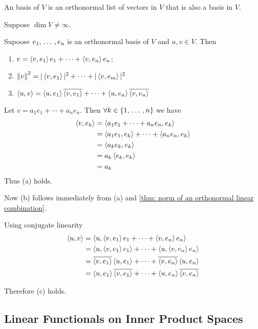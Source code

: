 \begin{mydef}
  An  basis of $V$ is an orthonormal list of vectors in $V$ that is also a basis in $V$.
\end{mydef}

\begin{mydef}
  Suppose $\dim V \neq \infty$.
\end{mydef}

\begin{thm}
  Supoose $e_1, \ddd, e_n$ is an orthonormal basis of $V$ and $u,v \in V$. Then
  \begin{enumerate}[label=(\alph*)]
    \item $v=\ip{v}{e_1}e_1 + \cdots + \ip{v}{e_n}e_n$;
    \item $\norm{v}^2 = |\ip{v}{e_1}|^2 + \cdots + |\ip{v}{e_m}|^2$
    \item $\ip{u}{v} = \ip{u}{e_1} \overline{\ip{v}{e_1}} + \cdots + \ip{u}{e_n} \overline{\ip{v}{e_n}}$
  \end{enumerate}
\end{thm}
\begin{prf}
  Let $v=a_1 e_1 + \cdots + a_n e_n$. Then $\forall k \in \{1, \ddd, n\}$ we have
  \begin{equation}
    \begin{aligned}
      \ip{v}{e_k}
      &=\ip{a_1 e_1 + \cdots + a_n e_n}{e_k} \\
      &=\ip{a_1 e_1}{e_k} + \cdots + \ip{a_n e_n}{e_k}\\
      &=\ip{a_ke_k}{e_k} \\
      &= a_k\ip{e_k}{e_k} \\
      &=a_k
    \end{aligned}
  \end{equation}
  Thus (a) holds.

  Now (b) follows immediately from (a) and \ref{thm: norm of an orthonormal linear combination}.

  Using conjugate linearity
  \begin{equation}
    \begin{aligned}
      \ip{u}{v}
      &=\ip{u}{\ip{v}{e_1}e_1 + \cdots + \ip{v}{e_n}e_n} \\
      &= \ip{u}{\ip{v}{e_1}e_1} + \cdots + \ip{u}{\ip{v}{e_n}e_n} \\
      &= \overline{\ip{v}{e_1}}\ip{u}{e_1} + \cdots + \overline{\ip{v}{e_n}}\ip{u}{e_n} \\
      &= \ip{u}{e_1}\overline{\ip{v}{e_1}} + \cdots + \ip{u}{e_n}\overline{\ip{v}{e_n}}
    \end{aligned}
  \end{equation}

  Therefore (c) holds.
\end{prf}

\subsection{Linear Functionals on Inner Product Spaces}